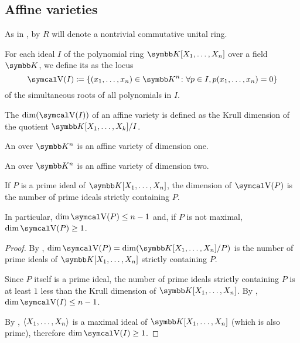 \subsection{Affine varieties}\label{subsec:affine_varieties}

As in , by \( R \) will denote a nontrivial commutative unital ring.

\begin{definition}\label{def:affine_variety}\cite[69]{Коцев2016}
  For each ideal \( I \) of the polynomial ring \( \BK[X_1, \ldots, X_n] \) over a field \( \BK \), we define its  as the locus
  \begin{equation*}
    \CV(I) \coloneqq \{ (x_1, \ldots, x_n) \in \BK^n \colon \forall p \in I, p(x_1, \ldots, x_n) = 0 \}
  \end{equation*}
  of the simultaneous roots of all polynomials in \( I \).

  \begin{defenum}
     The  \( \dim(\CV(I)) \) of an affine variety is defined as the Krull dimension of the quotient \( \BK[X_1, \ldots, X_k] / I \).

     An  over \( \BK^n \) is an affine variety of dimension one.

     An  over \( \BK^n \) is an affine variety of dimension two.
  \end{defenum}
\end{definition}

\begin{proposition}\label{thm:dimension_of_variety_of_prime_ideal}
  If \( P \) is a prime ideal of \( \BK[X_1, \ldots, X_n] \), the dimension of \( \CV(P) \) is the number of prime ideals strictly containing \( P \).

  In particular, \( \dim \CV(P) \leq n - 1 \) and, if \( P \) is not maximal, \( \dim \CV(P) \geq 1 \).
\end{proposition}
\begin{proof}
  By , \( \dim \CV(P) = \dim(\BK[X_1, \ldots, X_n] / P) \) is the number of prime ideals of \( \BK[X_1, \ldots, X_n] \) strictly containing \( P \).

  Since \( P \) itself is a prime ideal, the number of prime ideals strictly containing \( P \) is at least \( 1 \) less than the Krull dimension of \( \BK[X_1, \ldots, X_n] \). By , \( \dim \CV(I) \leq n - 1 \).

  By , \( \left\langle X_1, \ldots, X_n \right\rangle \) is a maximal ideal of \( \BK[X_1, \ldots, X_n] \) (which is also prime), therefore \( \dim \CV(I) \geq 1 \).
\end{proof}

